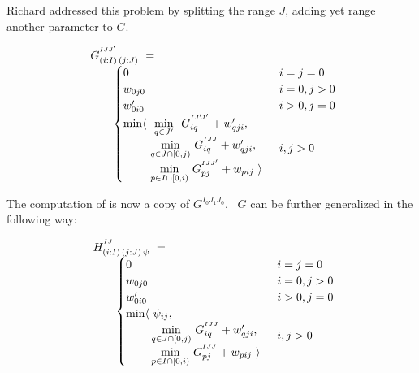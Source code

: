 Richard addressed this problem by splitting the range $J$, adding yet range another parameter to $G$.

\begin{equation}\LeftEqNo
\begin{array}{l@{}l}
	G^{^{IJJ'}}_{(i:I)\,(j:J)} ~=~  \\
	\qquad
	\begin{cases}
		0                         & i=j=0 \\
		w_{0j0}                   & i=0, j>0 \\
		w'_{0i0}                  & i>0, j=0 \\
		\begin{array}{@{}l@{~}l}
		  \min\langle & \underset{~q\in J'~}\min ~ G^{^{IJ'\!J'}}_{iq} + \yw{qji}, \\
		              & \underset{q\in J\cap[0,j)}\min ~ G^{^{IJJ}}_{iq} + \yw{qji}, \\
		              & \underset{p\in I\cap[0,i)}\min ~ G^{^{IJJ'}}_{pj} + \xw{pij}~\rangle
		\end{array}              & i,j>0
	\end{cases}
\end{array}
\end{equation}

The computation of  is now a copy of $G^{I_0J_1J_0}$. ~$G$ can be further generalized in the following
way:

\newcommand{\Ggen}{H}

\begin{equation}\LeftEqNo
\begin{array}{l@{}l}
	\Ggen^{^{IJ}}_{(i:I)\,(j:J)\,\psi} ~=~  \\
	\qquad
	\begin{cases}
		0                         & i=j=0 \\
		w_{0j0}                   & i=0, j>0 \\
		w'_{0i0}                  & i>0, j=0 \\
		\begin{array}{@{}l@{~}l}
		  \min\langle & \psi_{ij}, \\
		              & \!\underset{q\in J\cap[0,j)}\min ~ G^{^{IJJ}}_{iq} + \yw{qji}, \\
		              & \!\underset{p\in I\cap[0,i)}\min ~ G^{^{IJJ}}_{pj} + \xw{pij}~\rangle
		\end{array}              & i,j>0
	\end{cases}
\end{array}
\label{intro:Ggen}
\end{equation}

